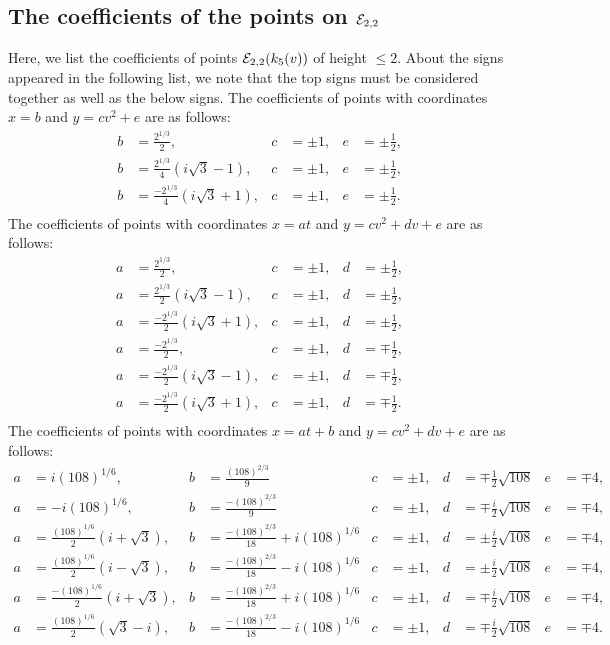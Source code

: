 \documentclass[11pt]{amsart}
\begin{document}
\subsection{The coefficients of the points on ${\mathcal E}_{2,2}$}
Here, we list the coefficients of  points ${\mathcal E}_{2,2}(k_5(v))$ of height $\leq 2$.
About the signs appeared in the following list, we note that the top signs must be considered together as well as the below signs. 
The coefficients of  points with coordinates $x= b$ and $y=c v^2 + e$ are as follows:	
\begin{align*}
	b& = \frac{2^{1/3}}{2}, & c&= \pm 1, & e&= \pm \frac{1}{2},\\
	b& = \frac{2^{1/3}}{4}\left( i \sqrt{3}-1\right) , & c&= \pm 1, & e&= \pm \frac{1}{2},\\
	b& = \frac{-2^{1/3}}{4}\left( i \sqrt{3}+1\right) , & c&= \pm 1, & e&= \pm \frac{1}{2}.\\
\end{align*}	
%
The  coefficients of  points with coordinates $x= a t$ and $y=c v^2 + d v+ e$ are as follows:	
\begin{align*}
	a& = \frac{2^{1/3}}{2}, & c&= \pm 1, & d&= \pm \frac{1}{2},\\
	a& = \frac{2^{1/3}}{2}\left( i \sqrt{3}-1\right), & c&= \pm 1, & d&= \pm \frac{1}{2},\\
	a& = \frac{-2^{1/3}}{2}\left( i \sqrt{3}+1\right), & c&= \pm 1, & d&= \pm \frac{1}{2},\\
	a& = \frac{-2^{1/3}}{2}, & c&= \pm 1, & d&= \mp \frac{1}{2},\\
	a& = \frac{-2^{1/3}}{2}\left( i \sqrt{3}-1\right), & c&= \pm 1, & d&= \mp \frac{1}{2},\\
	a& = \frac{-2^{1/3}}{2}\left( i \sqrt{3}+1\right), & c&= \pm 1, & d&= \mp \frac{1}{2}.\\
\end{align*}
%
The  coefficients of  points with coordinates $x= a t + b$ and $y=c v^2 + d v+ e$ are as follows:
\begin{align*}
	a& = i (108)^{1/6}, & b&=\frac{(108)^{2/3}}{9} & 
	c&= \pm 1, & d&= \mp \frac{1}{2} \sqrt{108} & e & = \mp 4,\\
	a& = -i (108)^{1/6} , & b&=\frac{-(108)^{2/3}}{9} &
	c&= \pm 1, & d&= \mp \frac{i}{2} \sqrt{108} & e & = \mp 4,\\
	a& = \frac{(108)^{1/6}}{2}\left( i +\sqrt{3}\right), & b&=\frac{-(108)^{2/3}}{18}+ i  (108)^{1/6} & c&= \pm 1, & d&= \pm \frac{i}{2} \sqrt{108} & e & = \mp 4,\\
	a& =\frac{(108)^{1/6}}{2}\left( i -\sqrt{3}\right), & b&=\frac{-(108)^{2/3}}{18}- i  (108)^{1/6} & c&= \pm 1, & d&= \pm \frac{i}{2} \sqrt{108} & e & = \mp 4,\\
	a& = \frac{-(108)^{1/6}}{2}\left( i +\sqrt{3}\right), & b&=\frac{-(108)^{2/3}}{18}+ i  (108)^{1/6} & c&= \pm 1, & d&= \mp \frac{i}{2} \sqrt{108} & e & = \mp 4,\\
	a& =\frac{(108)^{1/6}}{2}\left( \sqrt{3}-i\right), & b&=\frac{-(108)^{2/3}}{18}- i  (108)^{1/6} & c&= \pm 1, & d&= \mp \frac{i}{2} \sqrt{108} & e & = \mp 4.
\end{align*}
\fi
 
 

 

{} 
\end{document}
